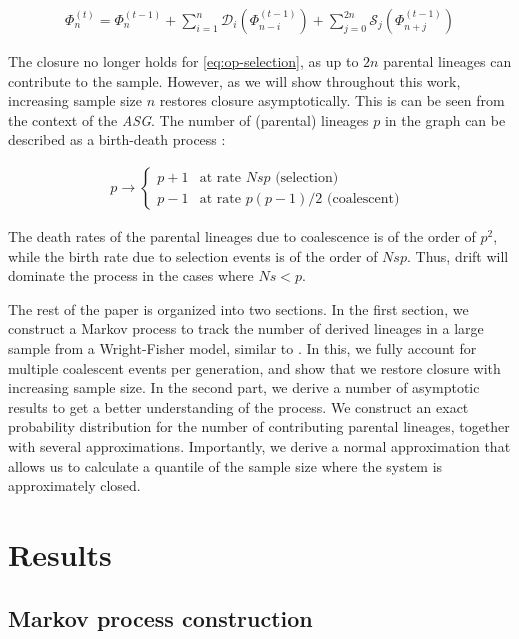 \documentclass[review]{elsarticle}
\newcommand{\ra}{\rightarrow}
\begin{document}
\begin{align}
  \label{eq:op-selection}
  \Phi_{n}^{(t)}=\Phi_{n}^{(t-1)}+\sum_{i=1}^{n}\mathcal{D}_i(\Phi_{n-i}^{(t-1)}) + \sum_{j=0}^{2n}\mathcal{S}_j(\Phi_{n+j}^{(t-1)})
\end{align}

The closure no longer holds for \eqref{eq:op-selection}, as up to $2n$ parental lineages can
contribute to the sample. However, as we will show throughout this work, increasing sample size $n$
restores closure asymptotically. This is can be seen from the context of the \textit{ASG}. The
number of (parental) lineages $p$ in the graph can be described as a birth-death process
\cite{KroneNeuhauser1997, Wakeley2009}:

\begin{align}
  \label{eq:asg-size}
  p \ra \begin{cases}
      p+1 & \text{at rate } Nsp  \text{ (selection) }\\
      p-1 & \text{at rate } p (p-1)/2 \text{ (coalescent) }
    \end{cases}
\end{align}

The death rates of the parental lineages due to coalescence is of the order of $p^2$, while the
birth rate due to selection events is of the order of $Nsp$. Thus, drift will dominate the process in
the cases where $Ns < p$.

The rest of the paper is organized into two sections. In the first section, we construct a Markov
process to track the number of derived lineages in a large sample from a Wright-Fisher model,
similar to \cite{JouganousEtAl2017,KammEtAl2017}. In this, we fully account for multiple coalescent
events per generation, and show that we restore closure with increasing sample size. In the second
part, we derive a number of asymptotic results to get a better understanding of the process. We
construct an exact probability distribution for the number of contributing parental lineages,
together with several approximations. Importantly, we derive a normal approximation that allows us
to calculate a quantile of the sample size where the system is approximately closed.

\section{Results}
\label{sec:results}

\subsection{Markov process construction}
\label{subsec:markov}
\end{document}
